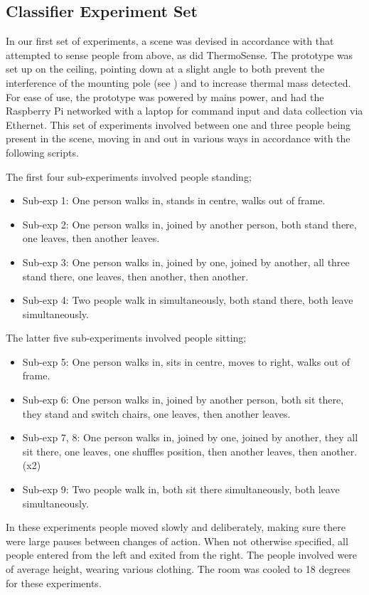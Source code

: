 \documentclass[../thesis/thesis.tex]{subfiles}
\begin{document}
\subsection{Classifier Experiment Set}
In our first set of experiments, a scene was devised in accordance with  that attempted to sense people from above, as did ThermoSense. The prototype was set up on the ceiling, pointing down at a slight angle to both prevent the interference of the mounting pole (see ) and to increase thermal mass detected. For ease of use, the prototype was powered by mains power, and had the Raspberry Pi networked with a laptop for command input and data collection via Ethernet. This set of experiments involved between one and three people being present in the scene, moving in and out in various ways in accordance with the following scripts.

The first four sub-experiments involved people standing;
\begin{itemize}
\item Sub-exp 1: One person walks in, stands in centre, walks out of frame.
\item Sub-exp 2: One person walks in, joined by another person, both stand there, one leaves, then another leaves.
\item Sub-exp 3: One person walks in, joined by one, joined by another, all three stand there, one leaves, then another, then another.
\item Sub-exp 4: Two people walk in simultaneously, both stand there, both leave simultaneously.
\end{itemize}

The latter five sub-experiments involved people sitting;
\begin{itemize}
\item Sub-exp 5: One person walks in, sits in centre, moves to right, walks out of frame.
\item Sub-exp 6: One person walks in, joined by another person, both sit there, they stand and switch chairs, one leaves, then another leaves.
\item Sub-exp 7, 8: One person walks in, joined by one, joined by another, they all sit there, one leaves, one shuffles position, then another leaves, then another. (x2)
\item Sub-exp 9: Two people walk in, both sit there simultaneously, both leave simultaneously.
\end{itemize}

In these experiments people moved slowly and deliberately, making sure there were large pauses between changes of action. When not otherwise specified, all people entered from the left and exited from the right. The people involved were of average height, wearing various clothing. The room was cooled to 18 degrees for these experiments.
\end{document}
